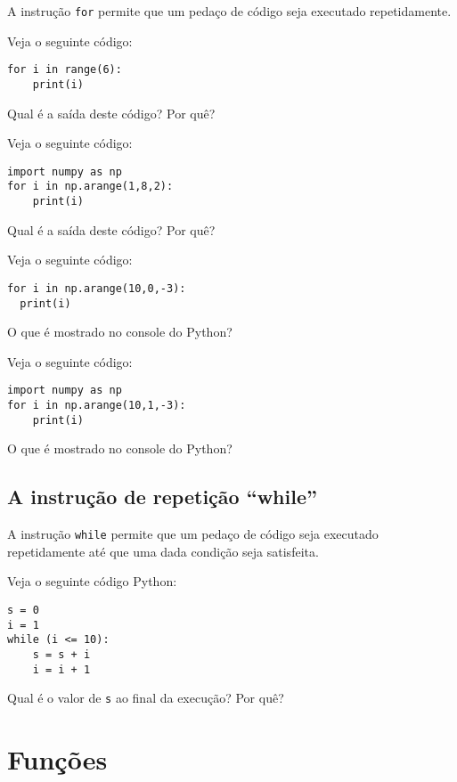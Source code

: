 A instrução \verb+for+ permite que um pedaço de código seja executado repetidamente.

\begin{ex}
  Veja o seguinte código:
\begin{verbatim}
for i in range(6):
    print(i)
\end{verbatim}
Qual é a saída deste código? Por quê?
\end{ex}

\begin{ex}
  Veja o seguinte código:
\begin{verbatim}
import numpy as np
for i in np.arange(1,8,2):
    print(i)
\end{verbatim}
Qual é a saída deste código? Por quê?
\end{ex}

\begin{ex}
  Veja o seguinte código:
\begin{verbatim}
for i in np.arange(10,0,-3):
  print(i)
\end{verbatim}
O que é mostrado no console do Python?
\end{ex}

\begin{ex}
  Veja o seguinte código:
\begin{verbatim}
import numpy as np
for i in np.arange(10,1,-3):
    print(i)
\end{verbatim}
O que é mostrado no console do Python?
\end{ex}

\subsection{A instrução de repetição ``while''}

A instrução \verb+while+ permite que um pedaço de código seja executado repetidamente até que uma dada condição seja satisfeita.

\begin{ex}
Veja o seguinte código Python:
\begin{verbatim}
s = 0
i = 1
while (i <= 10):
    s = s + i
    i = i + 1
\end{verbatim}
Qual é o valor de \verb+s+ ao final da execução? Por quê?
\end{ex}

\section{Funções}

